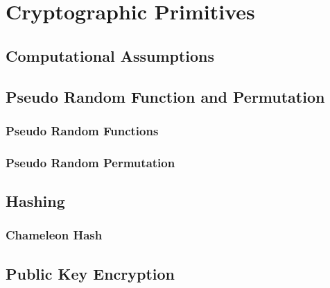 








\maketitle

\ifTableOfContents 
	\tableofcontents
	\newpage
\fi


\part{Cryptographic Primitives}
\chapter{Computational Assumptions}

\chapter{Pseudo Random Function and Permutation}
	\section{Pseudo Random Functions}
	
	
	\section{Pseudo Random Permutation}

\chapter{Hashing}
	\section{Chameleon Hash}
	

\chapter{Public Key Encryption}
